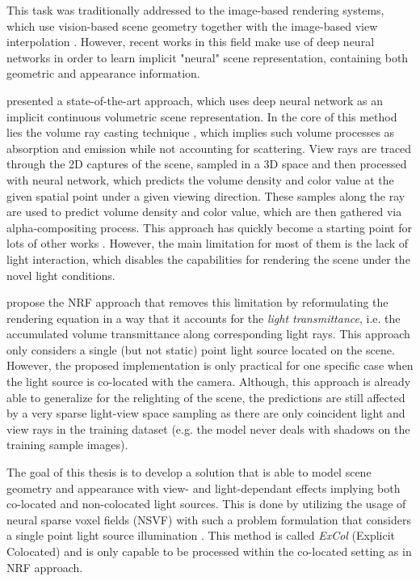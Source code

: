 This task was traditionally addressed to the image-based rendering systems,
which use vision-based scene geometry together with the image-based view interpolation \cite{shumandkang2000}.
However, recent works in this field make use of deep neural networks
in order to learn implicit "neural" scene representation,
containing both geometric and appearance information. \cite{tewari2020state}

\cite{mildenhall2020nerf} presented a state-of-the-art approach,
which uses deep neural network as an implicit continuous volumetric scene representation.
In the core of this method lies the volume ray casting technique \cite{drebin1988volume},
which implies such volume processes as absorption and emission
while not accounting for scattering.
View rays are traced through the 2D captures of the scene,
sampled in a 3D space and then processed with neural network,
which predicts the volume density and color value at the given spatial point under a given viewing direction.
These samples along the ray are used to predict volume density and color value,
which are then gathered via alpha-compositing process.
This approach has quickly become a starting point for lots of other works \cite{liu2021neural, garbin2021fastnerf, reiser2021kilonerf, yu2021plenoctrees, rebain2020derf, lindell2021autoint}.
However, the main limitation for most of them is the lack of light interaction,
which disables the capabilities for rendering the scene under the novel light conditions.

\cite{bi2020neural} propose the NRF approach
that removes this limitation by reformulating the rendering equation in a way
that it accounts for the \textit{light transmittance},
i.e. the accumulated volume transmittance along corresponding light rays.
This approach only considers a single (but not static) point light source located on the scene.
However, the proposed implementation is only practical for one specific case
when the light source is co-located with the camera.
Although, this approach is already able to generalize for the relighting of the scene,
the predictions are still affected by a very sparse light-view space sampling
as there are only coincident light and view rays in the training dataset
(e.g. the model never deals with shadows on the training sample images).


The goal of this thesis is to develop a solution
that is able to model scene geometry and appearance with view- and light-dependant effects
implying both co-located and non-colocated light sources.
This is done by utilizing the usage of neural sparse voxel fields (NSVF) \cite{liu2021neural}
with such a problem formulation that considers a single point light source illumination \cite{bi2020neural}.
This method is called \textit{ExCol} (Explicit Colocated) and is only capable
to be processed within the co-located setting as in NRF approach.

